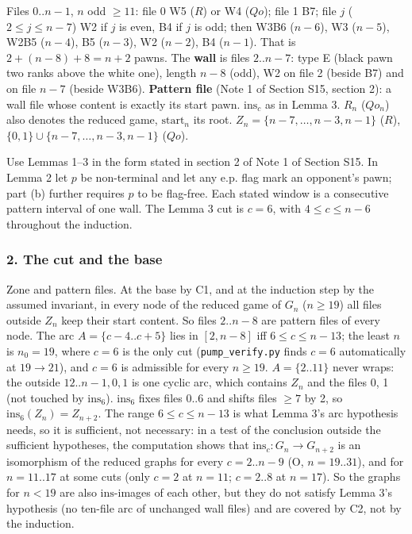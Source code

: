 Files $0..n-1$, $n$ odd $\ge11$: file 0 W5 ($R$) or W4 ($Qo$); file 1 B7; file $j$ ($2\le j\le n-7$) W2 if $j$ is even, B4 if $j$ is odd; then W3B6 ($n-6$), W3 ($n-5$), W2B5 ($n-4$), B5 ($n-3$), W2 ($n-2$), B4 ($n-1$). That is $2+(n-8)+8=n+2$ pawns. The \textbf{wall} is files $2..n-7$: type E (black pawn two ranks above the white one), length $n-8$ (odd), W2 on file 2 (beside B7) and on file $n-7$ (beside W3B6). \textbf{Pattern file} (Note 1 of Section S15, section 2): a wall file whose content is exactly its start pawn. $\mathrm{ins}_c$ as in Lemma 3. $R_n$ ($Qo_n$) also denotes the reduced game, $\mathrm{start}_n$ its root. $Z_n=\{n-7,\dots,n-3,n-1\}$ ($R$), $\{0,1\}\cup\{n-7,\dots,n-3,n-1\}$ ($Qo$).

Use Lemmas 1–3 in the form stated in section 2 of Note 1 of Section S15. In Lemma 2 let $p$ be non-terminal and let any e.p. flag mark an opponent's pawn; part (b) further requires $p$ to be flag-free. Each stated window is a consecutive pattern interval of one wall. The Lemma 3 cut is $c=6$, with $4\le c\le n-6$ throughout the induction.

\subsubsection*{2. The cut and the base}
Zone and pattern files. At the base by C1, and at the induction step by the assumed invariant, in every node of the reduced game of $G_n$ ($n\ge19$) all files outside $Z_n$ keep their start content. So files $2..n-8$ are pattern files of every node. The arc $A=\{c-4..c+5\}$ lies in $[2,n-8]$ iff $6\le c\le n-13$; the least $n$ is $n_0=19$, where $c=6$ is the only cut (\texttt{pump\_verify.py} finds $c=6$ automatically at $19\to21$), and $c=6$ is admissible for every $n\ge19$. $A=\{2..11\}$ never wraps: the outside $12..n-1,0,1$ is one cyclic arc, which contains $Z_n$ and the files 0, 1 (not touched by $\mathrm{ins}_6$). $\mathrm{ins}_6$ fixes files $0..6$ and shifts files $\ge7$ by 2, so $\mathrm{ins}_6(Z_n)=Z_{n+2}$. The range $6\le c\le n-13$ is what Lemma 3's arc hypothesis needs, so it is sufficient, not necessary: in a test of the conclusion outside the sufficient hypotheses, the computation shows that $\mathrm{ins}_c:G_n\to G_{n+2}$ is an isomorphism of the reduced graphs for every $c=2..n-9$ (O, $n=19..31$), and for $n=11..17$ at some cuts (only $c=2$ at $n=11$; $c=2..8$ at $n=17$). So the graphs for $n<19$ are also $\mathrm{ins}$-images of each other, but they do not satisfy Lemma 3's hypothesis (no ten-file arc of unchanged wall files) and are covered by C2, not by the induction.

